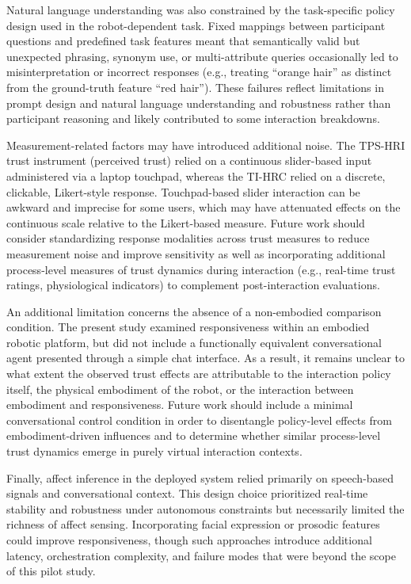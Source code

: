 \documentclass[
  authoryear,
  doubleblind,
  3p]{elsarticle}
\begin{document}
Natural language understanding was also constrained by the task-specific
policy design used in the robot-dependent task. Fixed mappings between
participant questions and predefined task features meant that
semantically valid but unexpected phrasing, synonym use, or
multi-attribute queries occasionally led to misinterpretation or
incorrect responses (e.g., treating ``orange hair'' as distinct from the
ground-truth feature ``red hair''). These failures reflect limitations
in prompt design and natural language understanding and robustness
rather than participant reasoning and likely contributed to some
interaction breakdowns.

Measurement-related factors may have introduced additional noise. The
TPS-HRI trust instrument (perceived trust) relied on a continuous
slider-based input administered via a laptop touchpad, whereas the
TI-HRC relied on a discrete, clickable, Likert-style response.
Touchpad-based slider interaction can be awkward and imprecise for some
users, which may have attenuated effects on the continuous scale
relative to the Likert-based measure. Future work should consider
standardizing response modalities across trust measures to reduce
measurement noise and improve sensitivity as well as incorporating
additional process-level measures of trust dynamics during interaction
(e.g., real-time trust ratings, physiological indicators) to complement
post-interaction evaluations.

An additional limitation concerns the absence of a non-embodied
comparison condition. The present study examined responsiveness within
an embodied robotic platform, but did not include a functionally
equivalent conversational agent presented through a simple chat
interface. As a result, it remains unclear to what extent the observed
trust effects are attributable to the interaction policy itself, the
physical embodiment of the robot, or the interaction between embodiment
and responsiveness. Future work should include a minimal conversational
control condition in order to disentangle policy-level effects from
embodiment-driven influences and to determine whether similar
process-level trust dynamics emerge in purely virtual interaction
contexts.

Finally, affect inference in the deployed system relied primarily on
speech-based signals and conversational context. This design choice
prioritized real-time stability and robustness under autonomous
constraints but necessarily limited the richness of affect sensing.
Incorporating facial expression or prosodic features could improve
responsiveness, though such approaches introduce additional latency,
orchestration complexity, and failure modes that were beyond the scope
of this pilot study.
\end{document}
